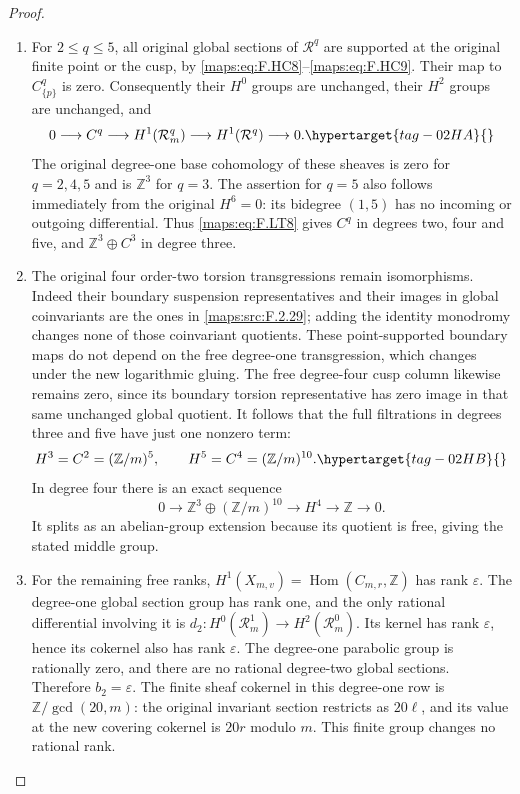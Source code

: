 \documentclass[11pt,a4paper]{article}
\numberwithin{equation}{section}
\theoremstyle{definition}
\begin{document}
\begin{proof}
\begin{enumerate}[label=\arabic*.]
\item For $2\le q\le5$, all original global sections of
$\mathcal R^q$ are supported at the original finite
point or the cusp, by \eqref{maps:eq:F.HC8}--\eqref{maps:eq:F.HC9}.
Their map to $C^q_{\{p\}}$ is zero.
Consequently their $H^0$ groups are unchanged,
their $H^2$ groups are unchanged, and
\begin{equation}
 0\longrightarrow C^q
  \longrightarrow H^1(\mathcal R_m^q)
  \longrightarrow H^1(\mathcal R^q)
  \longrightarrow0 .
\hypertarget{tag-02HA}{}\label{maps:eq:F.LT8}
\end{equation}
The original degree-one base cohomology of these
sheaves is zero for $q=2,4,5$ and is $\mathbb Z^3$
for $q=3$.
The assertion for $q=5$ also follows immediately
from the original $H^6=0$: its bidegree $(1,5)$
has no incoming or outgoing differential.
Thus \eqref{maps:eq:F.LT8} gives $C^q$ in degrees two, four and
five, and $\mathbb Z^3\oplus C^3$ in degree three.

\item The original four order-two torsion transgressions
remain isomorphisms.
Indeed their boundary suspension representatives and
their images in global coinvariants are the ones in
\ref{maps:src:F.2.29}; adding the identity monodromy changes none
of those coinvariant quotients.
These point-supported boundary maps do not depend
on the free degree-one transgression, which changes
under the new logarithmic gluing.
The free degree-four cusp column likewise remains
zero, since its boundary torsion representative has
zero image in that same unchanged global quotient.
It follows that the full filtrations in degrees
three and five have just one nonzero term:
\begin{equation}
 H^3=C^2=(\mathbb Z/m)^5,\qquad
 H^5=C^4=(\mathbb Z/m)^{10}.
\hypertarget{tag-02HB}{}\label{maps:eq:F.LT9}
\end{equation}
In degree four there is an exact sequence
\[
 0\longrightarrow
       \mathbb Z^3\oplus(\mathbb Z/m)^{10}
  \longrightarrow H^4
  \longrightarrow\mathbb Z\longrightarrow0.
\]
It splits as an abelian-group extension because
its quotient is free, giving the stated middle group.

\item For the remaining free ranks,
$H^1(X_{m,v})=\operatorname{Hom}(C_{m,r},\mathbb Z)$
has rank $\varepsilon$.
The degree-one global section group has rank one,
and the only rational differential involving it is
$d_2:H^0(\mathcal R_m^1)\to H^2(\mathcal R_m^0)$.
Its kernel has rank $\varepsilon$, hence its
cokernel also has rank $\varepsilon$.
The degree-one parabolic group is rationally zero,
and there are no rational degree-two global sections.
Therefore $b_2=\varepsilon$.
The finite sheaf cokernel in this degree-one row is
$\mathbb Z/\gcd(20,m)$: the original invariant
section restricts as $20\ell$, and its value at
the new covering cokernel is $20r$ modulo $m$.
This finite group changes no rational rank.


\end{enumerate}
\end{proof}
\end{document}
